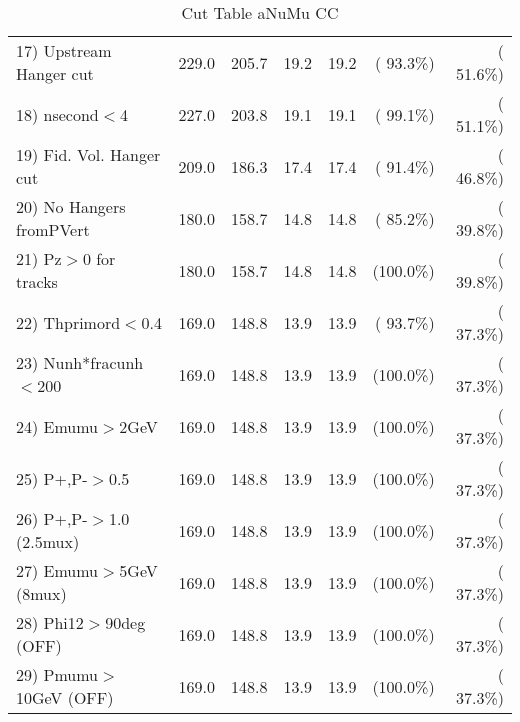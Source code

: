 \begin{table}[h!]
\begin{tabular}{||l||r|r|r|r|r|r||}
 17) Upstream Hanger cut  &        229.0 &        205.7 &         19.2 &         19.2 & ( 93.3\%) & ( 51.6\%) \\
 18) nsecond$<$4          &        227.0 &        203.8 &         19.1 &         19.1 & ( 99.1\%) & ( 51.1\%) \\
 19) Fid. Vol. Hanger cut &        209.0 &        186.3 &         17.4 &         17.4 & ( 91.4\%) & ( 46.8\%) \\
 20) No Hangers fromPVert &        180.0 &        158.7 &         14.8 &         14.8 & ( 85.2\%) & ( 39.8\%) \\
 21) Pz$>$0 for tracks    &        180.0 &        158.7 &         14.8 &         14.8 & (100.0\%) & ( 39.8\%) \\
 22) Thprimord$<$0.4      &        169.0 &        148.8 &         13.9 &         13.9 & ( 93.7\%) & ( 37.3\%) \\
 23) Nunh*fracunh$<$200   &        169.0 &        148.8 &         13.9 &         13.9 & (100.0\%) & ( 37.3\%) \\
 24) Emumu$>$2GeV         &        169.0 &        148.8 &         13.9 &         13.9 & (100.0\%) & ( 37.3\%) \\
 25) P+,P-$>$0.5          &        169.0 &        148.8 &         13.9 &         13.9 & (100.0\%) & ( 37.3\%) \\
 26) P+,P-$>$1.0 (2.5mux) &        169.0 &        148.8 &         13.9 &         13.9 & (100.0\%) & ( 37.3\%) \\
 27) Emumu$>$5GeV  (8mux) &        169.0 &        148.8 &         13.9 &         13.9 & (100.0\%) & ( 37.3\%) \\
 28) Phi12$>$90deg  (OFF) &        169.0 &        148.8 &         13.9 &         13.9 & (100.0\%) & ( 37.3\%) \\
 29) Pmumu$>$10GeV  (OFF) &        169.0 &        148.8 &         13.9 &         13.9 & (100.0\%) & ( 37.3\%) \\
 \hline
 \hline
 \end{tabular}
 \caption{Cut Table  aNuMu CC }
 \label{tab-cutcohjpsi-mumu_anumucc}
 \end{table}
